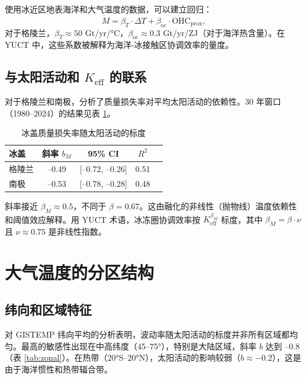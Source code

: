 \documentclass[12pt,a4paper]{article}
\newcommand{\Keff}{K_{\mathrm{eff}}}
\newcommand{\be}{\beta}
\begin{document}
	使用冰近区地表海洋和大气温度的数据，可以建立回归：
	\[
	\dot{M} = \beta_T \cdot \Delta T + \beta_{\text{oc}} \cdot \text{OHC}_{\text{prox}},
	\]
	对于格陵兰，\(\beta_T \approx 50\) Gt/yr/°C，\(\beta_{\text{oc}} \approx 0.3\) Gt/yr/ZJ（对于海洋热含量）。在 YUCT 中，这些系数被解释为海洋-冰接触区协调效率的量度。
	
	\subsection{与太阳活动和 \(\Keff\) 的联系}
	
	对于格陵兰和南极，分析了质量损失率对平均太阳活动的依赖性。30 年窗口（1980–2024）的结果见表 \ref{tab:icescaling}。
	
	\begin{table}[htbp]
		\centering
		\caption{冰盖质量损失率随太阳活动的标度}
		\label{tab:icescaling}
		\begin{tabular}{@{}lcccc@{}}
			\toprule
			冰盖 & 斜率 \(b_M\) & 95\% CI & \(R^2\) \\
			\midrule
			格陵兰 & –0.49 & [–0.72, –0.26] & 0.51 \\
			南极 & –0.53 & [–0.78, –0.28] & 0.48 \\
			\bottomrule
		\end{tabular}
	\end{table}
	
	斜率接近 \(\beta_M \approx 0.5\)，不同于 \(\be = 0.67\)。这由融化的非线性（抛物线）温度依赖性和阈值效应解释。用 YUCT 术语，冰冻圈协调效率按 \(\Keff^{\beta_M}\) 标度，其中 \(\beta_M = \be \cdot \nu\) 且 \(\nu \approx 0.75\) 是非线性指数。
	
	\section{大气温度的分区结构}
	
	\subsection{纬向和区域特征}
	
	对 GISTEMP 纬向平均的分析表明，波动率随太阳活动的标度并非所有区域都均匀。最高的敏感性出现在中高纬度（45–75°），特别是大陆区域，斜率 \(b\) 达到 –0.8（表 \ref{tab:zonal}）。在热带（20°S–20°N），太阳活动的影响较弱（\(b \approx -0.2\)），这是由于海洋惯性和热带辐合带。
	
\end{document}
